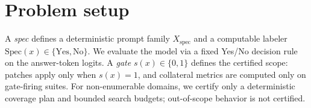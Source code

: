 \section{Problem setup}
A \emph{spec} defines a deterministic prompt family $X_{\text{spec}}$ and a computable labeler $\mathrm{Spec}(x)\in\{\text{Yes},\text{No}\}$.
We evaluate the model via a fixed Yes/No decision rule on the answer-token logits.
A \emph{gate} $s(x)\in\{0,1\}$ defines the certified scope: patches apply only when $s(x)=1$, and collateral metrics are computed only on gate-firing suites.
For non-enumerable domains, we certify only a deterministic coverage plan and bounded search budgets; out-of-scope behavior is not certified.
